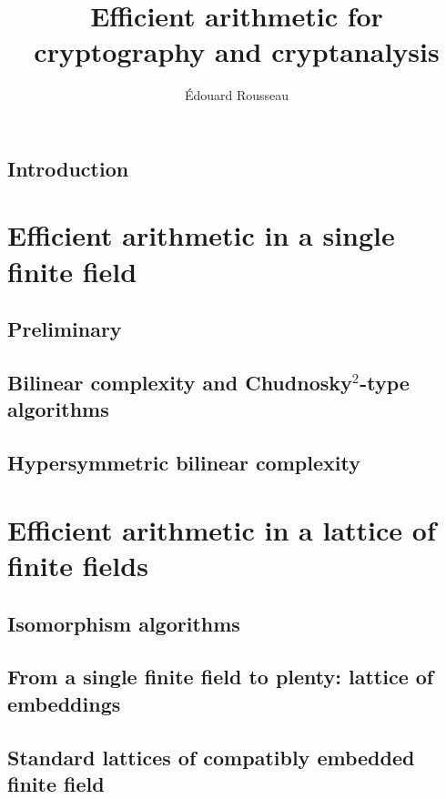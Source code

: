 \documentclass[a4paper,11pt]{report}
\title{Efficient arithmetic for cryptography and cryptanalysis}
\author{Édouard Rousseau}
\begin{document}
\maketitle



\dominitoc
\tableofcontents


\chapter{Introduction}


\part{Efficient arithmetic in a single finite field}
\label{part:single}

\chapter{Preliminary}
\label{chap:preliminary}


\chapter{Bilinear complexity and Chudnosky$^2$-type algorithms}
\label{chap:bilinear}


\chapter{Hypersymmetric bilinear complexity}
\label{chap:hypersymmetric}


\part{Efficient arithmetic in a lattice of finite fields}
\label{part:lattice}

\chapter{Isomorphism algorithms}
\label{chap:isomorphism}


\chapter{From a single finite field to plenty: lattice of embeddings}
\label{chap:lattice}


\chapter{Standard lattices of compatibly embedded finite field}
\label{chap:standard}


\clearpage


\end{document}
